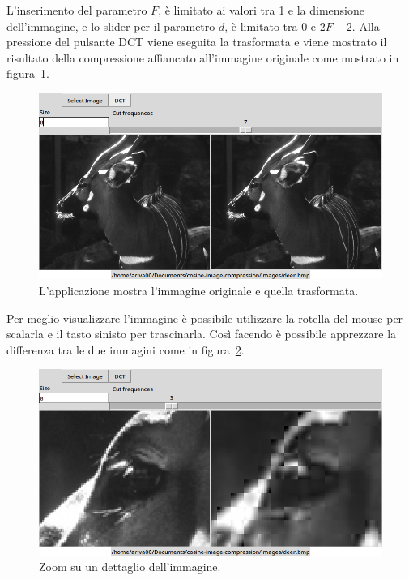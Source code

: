 \documentclass[a4paper, 12pt]{article}
\begin{document}
L'inserimento del parametro $F$, è limitato ai valori tra 1 e la dimensione 
dell'immagine, e lo slider per il parametro $d$, è limitato tra $0$ e $2F-2$.
Alla pressione del pulsante DCT viene eseguita la trasformata e viene mostrato
il risultato della compressione affiancato all'immagine originale come mostrato
in figura~\ref{fig:after-transform}.

\begin{figure}[h]
  \includegraphics[width=\textwidth]{./imgs/after-transform.png}
  \caption{L'applicazione mostra l'immagine originale e quella trasformata.}
  \label{fig:after-transform}
\end{figure}

Per meglio visualizzare l'immagine è possibile utilizzare la rotella del mouse 
per scalarla e il tasto sinisto per trascinarla. Così facendo è possibile
apprezzare la differenza tra le due immagini come in 
figura~\ref{fig:zoomed-detail}.

\begin{figure}[h]
  \includegraphics[width=\textwidth]{./imgs/zoomed-detail.png}
  \caption{Zoom su un dettaglio dell'immagine.}
  \label{fig:zoomed-detail}
\end{figure}
\end{document}
